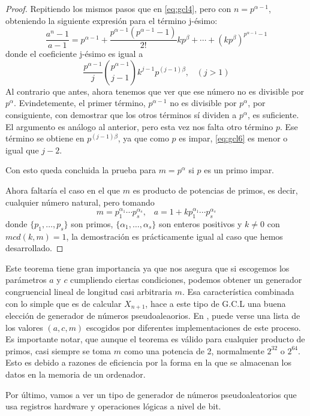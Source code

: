 \begin{proof}
Repitiendo los mismos pasos que en \eqref{eq:gcl4}, pero con $n=p^{\alpha-1}$, obteniendo la siguiente expresión para el término j-ésimo:
\begin{equation}\label{eq:gcl5}
\frac{a^n-1}{a-1}=p^{\alpha-1}+\frac{p^{\alpha-1}(p^{\alpha-1}-1)}{2!}kp^\beta+\cdots+(kp^\beta)^{p^{\alpha-1}-1}
\end{equation}
donde el coeficiente j-ésimo es igual a
\[
\frac{p^{\alpha-1}}{j} \binom{p^{\alpha-1}}{j-1} k^{j-1}p^{(j-1)\beta}, \;\;\; (j>1)
\]
Al contrario que antes, ahora tenemos que ver que ese número no es divisible por $p^\alpha$. Evindetemente, el primer término, $p^{\alpha-1}$ no es divisible por $p^\alpha$, por consiguiente, con demostrar que los otros términos sí dividen a $p^\alpha$, es suficiente. El argumento es análogo al anterior, pero esta vez nos falta otro término $p$. Ese término se obtiene en $p^{(j-1)\beta}$, ya que como $p$ es impar, \eqref{eq:gcl6} es menor o igual que $j-2$.

Con esto queda concluida la prueba para $m=p^\alpha$ si $p$ es un primo impar.


Ahora faltaría el caso en el que $m$ es producto de potencias de primos, es decir, cualquier número natural, pero tomando 
\[
m=p_1^{\alpha_1}\cdots p_s^{\alpha_s}, \;\;\; a=1+kp_1^{\alpha_1}\cdots p_s^{\alpha_s}
\]
donde $\{p_1,\ldots, p_s\}$ son primos, $\{\alpha_1,\ldots,\alpha_s\}$ son enteros positivos y $k\neq 0$ con $mcd(k,m)=1$, la demostración es prácticamente igual al caso que hemos desarrollado.
\end{proof}

Este teorema tiene gran importancia ya que nos asegura que si escogemos los parámetros $a$ y $c$ cumpliendo ciertas condiciones, podemos obtener un generador congruencial lineal de longitud casi arbitraria $m$. Esa característica combinada con lo simple que es de calcular $X_{n+1}$, hace a este tipo de G.C.L una buena elección de generador de números pseudoaleaorios. En \cite{wiki:000}, puede verse una lista de los valores $(a,c,m)$ escogidos por diferentes implementaciones de este proceso. Es importante notar, que aunque el teorema es válido para cualquier producto de primos, casi siempre se toma $m$ como una potencia de 2, normalmente $2^{32}$ o $2^{64}$. Esto es debido a razones de eficiencia por la forma en la que se almacenan los datos en la memoria de un ordenador.

Por último, vamos a ver un tipo de generador de números pseudoaleatorios que usa registros hardware y operaciones lógicas a nivel de bit.

